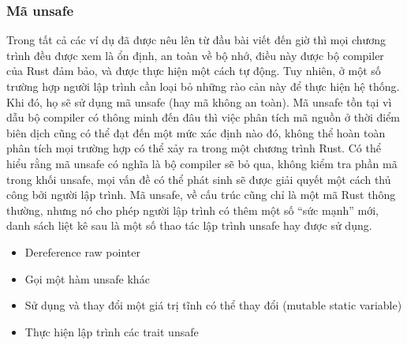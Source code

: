 \subsubsection{Mã unsafe}\label{lbl:unsafe_code}
Trong tất cả các ví dụ đã được nêu lên từ đầu bài viết đến giờ thì mọi chương trình đều được xem là ổn định, an toàn về bộ nhớ, điều này được bộ compiler của Rust đảm bảo, và được thực hiện một cách tự động.
Tuy nhiên, ở một số trường hợp người lập trình cần loại bỏ những rào cản này để thực hiện hệ thống.
Khi đó, họ sẽ sử dụng mã unsafe (hay mã không an toàn).
Mã unsafe tồn tại vì dẫu bộ compiler có thông minh đến đâu thì việc phân tích mã nguồn ở thời điểm biên dịch cũng có thể đạt đến một mức xác định nào đó, không thể hoàn toàn phân tích mọi trường hợp có thể xảy ra trong một chương trình Rust.
Có thể hiểu rằng mã unsafe có nghĩa là bộ compiler sẽ bỏ qua, không kiểm tra phần mã trong khối unsafe, mọi vấn đề có thể phát sinh sẽ được giải quyết một cách thủ công bởi người lập trình.
Mã unsafe, về cấu trúc cũng chỉ là một mã Rust thông thường, nhưng nó cho phép người lập trình có thêm một số ``sức mạnh'' mới, danh sách liệt kê sau là một số thao tác lập trình unsafe hay được sử dụng.
\begin{itemize}
\item Dereference raw pointer
\item Gọi một hàm unsafe khác
\item Sử dụng và thay đổi một giá trị tĩnh có thể thay đổi (mutable static variable)
\item Thực hiện lập trình các trait unsafe
\end{itemize}

